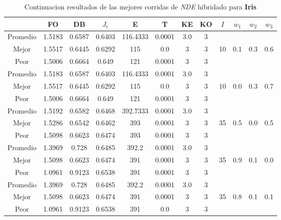 \begin{table}[h!]
    \footnotesize
    \begin{center}
        \begin{tabular}{|c|c|c|c|c|c|c|c|c|c|c|c|}
        \hline
            & {\bf FO} & {\bf DB} & $J_e$ & {\bf E} & {\bf T} & {\bf KE} & {\bf KO} & $I$ & $w_1$ & $w_2$ & $w_3$ \\
        \hline
        \hline
            Promedio  & 1.5183 & 0.6587 & 0.6403 & 116.4333 & 0.0001 & 3.0 & 3 &  &  &  & \\
            \cline{1-8}
            Mejor & 1.5517 & 0.6445  & 0.6292 & 115 & 0.0 & 3 & 3 & 10 & 0.1 & 0.3 & 0.6\\
            \cline{1-8}
            Peor & 1.5006 & 0.6664  & 0.649 & 121 & 0.0001 & 3 & 3 &  &  &  & \\
        \hline
        \hline
            Promedio  & 1.5183 & 0.6587 & 0.6403 & 116.4333 & 0.0001 & 3.0 & 3 &  &  &  & \\
            \cline{1-8}
            Mejor & 1.5517 & 0.6445  & 0.6292 & 115 & 0.0 & 3 & 3 & 10 & 0.0 & 0.3 & 0.7\\
            \cline{1-8}
            Peor & 1.5006 & 0.6664  & 0.649 & 121 & 0.0001 & 3 & 3 &  &  &  & \\
        \hline
        \hline
            Promedio  & 1.5192 & 0.6582 & 0.6468 & 392.7333 & 0.0001 & 3.0 & 3 &  &  &  & \\
            \cline{1-8}
            Mejor & 1.5286 & 0.6542  & 0.6462 & 393 & 0.0001 & 3 & 3 & 35 & 0.5 & 0.0 & 0.5\\
            \cline{1-8}
            Peor & 1.5098 & 0.6623  & 0.6474 & 393 & 0.0001 & 3 & 3 &  &  &  & \\
        \hline
        \hline
            Promedio  & 1.3969 & 0.728 & 0.6485 & 392.2 & 0.0001 & 3.0 & 3 &  &  &  & \\
            \cline{1-8}
            Mejor & 1.5098 & 0.6623  & 0.6474 & 391 & 0.0001 & 3 & 3 & 35 & 0.9 & 0.1 & 0.0\\
            \cline{1-8}
            Peor & 1.0961 & 0.9123  & 0.6538 & 391 & 0.0001 & 3 & 3 &  &  &  & \\
        \hline
        \hline
            Promedio  & 1.3969 & 0.728 & 0.6485 & 392.2 & 0.0001 & 3.0 & 3 &  &  &  & \\
            \cline{1-8}
            Mejor & 1.5098 & 0.6623  & 0.6474 & 391 & 0.0001 & 3 & 3 & 35 & 0.8 & 0.1 & 0.1\\
            \cline{1-8}
            Peor & 1.0961 & 0.9123  & 0.6538 & 391 & 0.0 & 3 & 3 &  &  &  & \\
        \hline
        \end{tabular}
        \caption{Continuacion resultados de las mejores corridas de \emph{NDE} hibridado para {\bf Iris}}
        \label{tb:tabledehibcsvc}
    \end{center}
\end{table}
